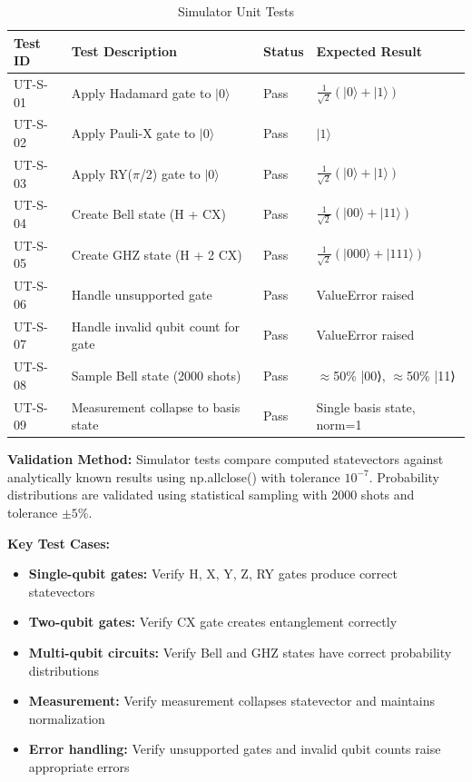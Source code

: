 \begin{table}[h]
\centering
\caption{Simulator Unit Tests}
\begin{tabular}{|p{2cm}|p{5cm}|p{2cm}|p{3cm}|}
\hline
\textbf{Test ID} & \textbf{Test Description} & \textbf{Status} & \textbf{Expected Result} \\
\hline
UT-S-01 & Apply Hadamard gate to $|0\rangle$ & Pass & $\frac{1}{\sqrt{2}}(|0\rangle + |1\rangle)$ \\
\hline
UT-S-02 & Apply Pauli-X gate to $|0\rangle$ & Pass & $|1\rangle$ \\
\hline
UT-S-03 & Apply RY($\pi$/2) gate to $|0\rangle$ & Pass & $\frac{1}{\sqrt{2}}(|0\rangle + |1\rangle)$ \\
\hline
UT-S-04 & Create Bell state (H + CX) & Pass & $\frac{1}{\sqrt{2}}(|00\rangle + |11\rangle)$ \\
\hline
UT-S-05 & Create GHZ state (H + 2 CX) & Pass & $\frac{1}{\sqrt{2}}(|000\rangle + |111\rangle)$ \\
\hline
UT-S-06 & Handle unsupported gate & Pass & ValueError raised \\
\hline
UT-S-07 & Handle invalid qubit count for gate & Pass & ValueError raised \\
\hline
UT-S-08 & Sample Bell state (2000 shots) & Pass & $\approx$50\% |00⟩, $\approx$50\% |11⟩ \\
\hline
UT-S-09 & Measurement collapse to basis state & Pass & Single basis state, norm=1 \\
\hline
\end{tabular}
\end{table}

\textbf{Validation Method:} Simulator tests compare computed statevectors against analytically known results using np.allclose() with tolerance $10^{-7}$. Probability distributions are validated using statistical sampling with 2000 shots and tolerance $\pm 5\%$.

\textbf{Key Test Cases:}
\begin{itemize}
\item \textbf{Single-qubit gates:} Verify H, X, Y, Z, RY gates produce correct statevectors
\item \textbf{Two-qubit gates:} Verify CX gate creates entanglement correctly
\item \textbf{Multi-qubit circuits:} Verify Bell and GHZ states have correct probability distributions
\item \textbf{Measurement:} Verify measurement collapses statevector and maintains normalization
\item \textbf{Error handling:} Verify unsupported gates and invalid qubit counts raise appropriate errors
\end{itemize}

